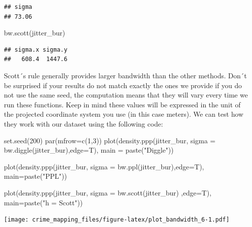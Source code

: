\documentclass[
  krantz2]{krantz}
\makeatletter
\newenvironment{Shaded}{\begin{snugshade}}{\end{snugshade}}
\newcommand{\AttributeTok}[1]{\textcolor[rgb]{0.61,0.61,0.61}{#1}}
\newcommand{\DecValTok}[1]{\textcolor[rgb]{0.06,0.06,0.06}{#1}}
\newcommand{\FunctionTok}[1]{\textcolor[rgb]{0,0,0}{#1}}
\newcommand{\NormalTok}[1]{#1}
\newcommand{\StringTok}[1]{\textcolor[rgb]{0.5,0.5,0.5}{#1}}
\newenvironment{kframe}{%
\medskip{}
\setlength{\fboxsep}{.8em}
 \def\at@end@of@kframe{}%
 \ifinner\ifhmode%
  \def\at@end@of@kframe{\end{minipage}}%
  \begin{minipage}{\columnwidth}%
 \fi\fi%
 \def\FrameCommand##1{\hskip\@totalleftmargin \hskip-\fboxsep
 \colorbox{shadecolor}{##1}\hskip-\fboxsep
     \hskip-\linewidth \hskip-\@totalleftmargin \hskip\columnwidth}%
 \MakeFramed {\advance\hsize-\width
   \@totalleftmargin\z@ \linewidth\hsize
   \@setminipage}}%
 {\par\unskip\endMakeFramed%
 \at@end@of@kframe}
\renewenvironment{Shaded}{\begin{kframe}}{\end{kframe}}
\makeatother
\begin{document}
\begin{verbatim}
## sigma 
## 73.06
\end{verbatim}

\begin{Shaded}
\begin{Highlighting}[]
\FunctionTok{bw.scott}\NormalTok{(jitter\_bur)}
\end{Highlighting}
\end{Shaded}

\begin{verbatim}
## sigma.x sigma.y 
##   608.4  1447.6
\end{verbatim}

Scott´s rule generally provides larger bandwidth than the other methods. Don´t be surprised if your results do not match exactly the ones we provide if you do not use the same seed, the computation means that they will vary every time we run these functions. Keep in mind these values will be expressed in the unit of the projected coordinate system you use (in this case meters). We can test how they work with our dataset using the following code:

\begin{Shaded}
\begin{Highlighting}[]
\FunctionTok{set.seed}\NormalTok{(}\DecValTok{200}\NormalTok{)}
\FunctionTok{par}\NormalTok{(}\AttributeTok{mfrow=}\FunctionTok{c}\NormalTok{(}\DecValTok{1}\NormalTok{,}\DecValTok{3}\NormalTok{))}
\FunctionTok{plot}\NormalTok{(}\FunctionTok{density.ppp}\NormalTok{(jitter\_bur, }\AttributeTok{sigma =} \FunctionTok{bw.diggle}\NormalTok{(jitter\_bur),}\AttributeTok{edge=}\NormalTok{T),}
     \AttributeTok{main =} \FunctionTok{paste}\NormalTok{(}\StringTok{"Diggle"}\NormalTok{))}

\FunctionTok{plot}\NormalTok{(}\FunctionTok{density.ppp}\NormalTok{(jitter\_bur, }\AttributeTok{sigma =} \FunctionTok{bw.ppl}\NormalTok{(jitter\_bur),}\AttributeTok{edge=}\NormalTok{T),}
     \AttributeTok{main=}\FunctionTok{paste}\NormalTok{(}\StringTok{"PPL"}\NormalTok{))}

\FunctionTok{plot}\NormalTok{(}\FunctionTok{density.ppp}\NormalTok{(jitter\_bur, }\AttributeTok{sigma =} \FunctionTok{bw.scott}\NormalTok{(jitter\_bur) ,}\AttributeTok{edge=}\NormalTok{T),}
     \AttributeTok{main=}\FunctionTok{paste}\NormalTok{(}\StringTok{"h = Scott"}\NormalTok{))}
\end{Highlighting}
\end{Shaded}

\texttt{[image: crime\_mapping\_files/figure-latex/plot\_bandwidth\_6-1.pdf]}
\end{document}
